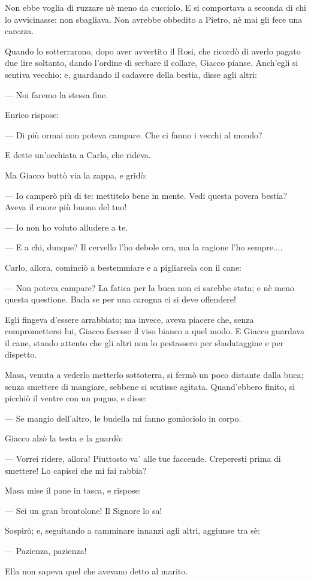 Non ebbe voglia di ruzzare nè meno da cucciolo. E si comportava a seconda di chi lo avvicinasse: non sbagliava. Non avrebbe obbedito a Pietro, nè mai gli fece una carezza.

Quando lo sotterrarono, dopo aver avvertito il Rosi, che ricordò di averlo pagato due lire soltanto, dando l’ordine di serbare il collare, Giacco pianse. Anch’egli si sentiva vecchio; e, guardando il cadavere della bestia, disse agli altri:

— Noi faremo la stessa fine.

Enrico rispose:

— Di più ormai non poteva campare. Che ci fanno i vecchi al mondo?

E dette un'occhiata a Carlo, che rideva.

Ma Giacco buttò via la zappa, e gridò:

— Io camperò più di te: mettitelo bene in mente. Vedi questa povera bestia? Aveva il cuore più buono del tuo!

— Io non ho voluto alludere a te.

— E a chi, dunque? Il cervello l'ho debole ora, ma la ragione l'ho sempre....

Carlo, allora, cominciò a bestemmiare e a pigliarsela con il cane:

— Non poteva campare? La fatica per la buca non ci sarebbe stata; e nè meno questa questione. Bada se per una carogna ci si deve offendere!

Egli fingeva d'essere arrabbiato; ma invece, aveva piacere che, senza compromettersi lui, Giacco facesse il viso bianco a quel modo. E Giacco guardava il cane, stando attento che gli altri non lo pestassero per sbadataggine e per dispetto.

Masa, venuta a vederlo metterlo sottoterra, si fermò un poco distante dalla buca; senza smettere di mangiare, sebbene si sentisse agitata. Quand'ebbero finito, si picchiò il ventre con un pugno, e disse:

— Se mangio dell'altro, le budella mi fanno gomìcciolo in corpo.

Giacco alzò la testa e la guardò:

— Vorrei ridere, allora! Piuttosto va' alle tue faccende. Creperesti prima di smettere! Lo capisci che mi fai rabbia?

Masa mise il pane in tasca, e rispose:

— Sei un gran brontolone! Il Signore lo sa!

Sospirò; e, seguitando a camminare innanzi agli altri, aggiunse tra sè:

— Pazienza, pazienza!

Ella non sapeva quel che avevano detto al marito.
